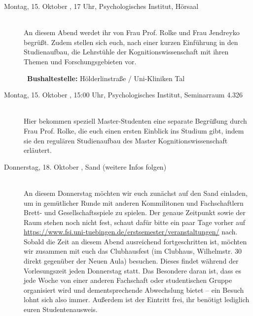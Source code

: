 \begin{description}

\ifkogwiss
\ifbachelor 
\item[Montag, 15. Oktober \Jahr, 17 Uhr, Psychologisches Institut, Hörsaal]\ \\
An diesem Abend werdet ihr von Frau Prof. Rolke und Frau Jendreyko begrüßt. Zudem stellen sich euch, nach einer kurzen Einführung in den Studienaufbau, die Lehrstühle der Kognitionswissenschaft mit ihren Themen und Forschungsgebieten vor.
\fi

~\textbf{Bushaltestelle:} Hölderlinstraße / Uni-Kliniken Tal
\fi 

\ifkogwiss
\ifmaster
\item[Montag, 15. Oktober \Jahr, 15:00 Uhr, Psychologisches Institut, Seminarraum 4.326 ]\ \\
Hier bekommen speziell Master-Studenten eine separate Begrüßung durch Frau Prof. Rolke, die euch einen ersten Einblick ins Studium gibt, indem sie den regulären Studienaufbau des Master Kognitionswissenschaft erläutert. %
\fi
\fi 




\item[Donnerstag, 18. Oktober \Jahr,  Sand (weitere Infos folgen)]\ \\
An diesem Donnerstag möchten wir euch zunächst auf den Sand einladen, um in gemütlicher Runde mit anderen Kommilitonen und Fachschaftlern Brett- und Gesellschaftsspiele zu spielen. Der genaue Zeitpunkt sowie der Raum stehen noch nicht fest, schaut dafür bitte ein paar Tage vorher auf \url{https://www.fsi.uni-tuebingen.de/erstsemester/veranstaltungen/} nach.\\ Sobald die Zeit an diesem Abend ausreichend fortgeschritten ist, möchten wir zusammen mit euch das Clubhausfest (im Clubhaus, Wilhelmstr. 30 direkt gegenüber der Neuen Aula) besuchen. Dieses findet während der Vorlesungszeit jeden Donnerstag statt. Das Besondere daran ist, dass es jede Woche von einer anderen Fachschaft oder studentischen Gruppe organisiert wird und dementsprechende Abwechslung bietet -- ein Besuch lohnt sich also immer. Außerdem ist der Eintritt frei, ihr benötigt lediglich euren Studentenausweis.


\end{description}

